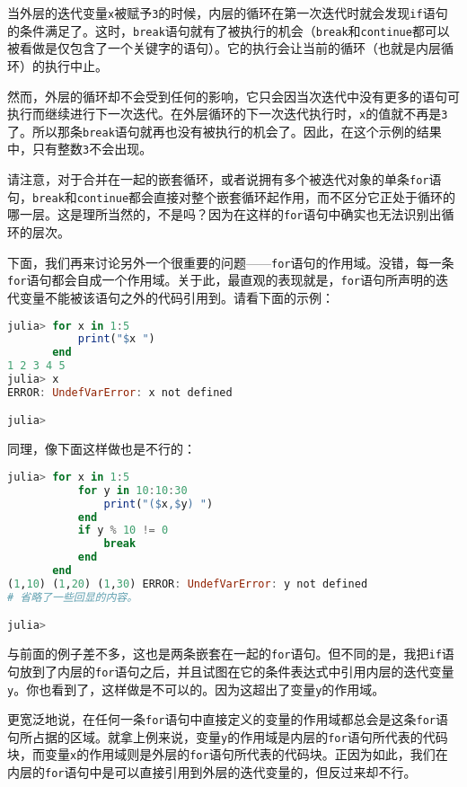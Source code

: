 当外层的迭代变量\verb`x`被赋予\verb`3`的时候，内层的循环在第一次迭代时就会发现\verb`if`语句的条件满足了。这时，\verb`break`语句就有了被执行的机会（\verb`break`和\verb`continue`都可以被看做是仅包含了一个关键字的语句）。它的执行会让当前的循环（也就是内层循环）的执行中止。

然而，外层的循环却不会受到任何的影响，它只会因当次迭代中没有更多的语句可执行而继续进行下一次迭代。在外层循环的下一次迭代执行时，\verb`x`的值就不再是\verb`3`了。所以那条\verb`break`语句就再也没有被执行的机会了。因此，在这个示例的结果中，只有整数\verb`3`不会出现。

请注意，对于合并在一起的嵌套循环，或者说拥有多个被迭代对象的单条\verb`for`语句，\verb`break`和\verb`continue`都会直接对整个嵌套循环起作用，而不区分它正处于循环的哪一层。这是理所当然的，不是吗？因为在这样的\verb`for`语句中确实也无法识别出循环的层次。

下面，我们再来讨论另外一个很重要的问题——\verb`for`语句的作用域。没错，每一条\verb`for`语句都会自成一个作用域。关于此，最直观的表现就是，\verb`for`语句所声明的迭代变量不能被该语句之外的代码引用到。请看下面的示例：
\begin{lstlisting}[language=julia]
julia> for x in 1:5
           print("$x ")
       end
1 2 3 4 5 
julia> x
ERROR: UndefVarError: x not defined

julia> 
\end{lstlisting}

同理，像下面这样做也是不行的：
\begin{lstlisting}[language=julia]
julia> for x in 1:5
           for y in 10:10:30
               print("($x,$y) ")
           end
           if y % 10 != 0 
               break
           end
       end
(1,10) (1,20) (1,30) ERROR: UndefVarError: y not defined
# 省略了一些回显的内容。

julia> 
\end{lstlisting}

与前面的例子差不多，这也是两条嵌套在一起的\verb`for`语句。但不同的是，我把\verb`if`语句放到了内层的\verb`for`语句之后，并且试图在它的条件表达式中引用内层的迭代变量\verb`y`。你也看到了，这样做是不可以的。因为这超出了变量\verb`y`的作用域。

更宽泛地说，在任何一条\verb`for`语句中直接定义的变量的作用域都总会是这条\verb`for`语句所占据的区域。就拿上例来说，变量\verb`y`的作用域是内层的\verb`for`语句所代表的代码块，而变量\verb`x`的作用域则是外层的\verb`for`语句所代表的代码块。正因为如此，我们在内层的\verb`for`语句中是可以直接引用到外层的迭代变量的，但反过来却不行。

